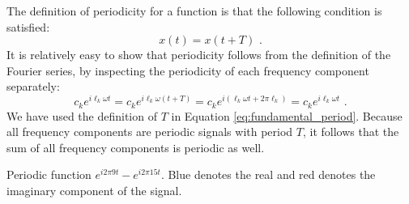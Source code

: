 The definition of periodicity for a function is that the following condition is satisfied:
\begin{equation}
\boxed{
x(t) = x(t+T)
} \,\,.
\end{equation}
It is relatively easy to show that periodicity follows from the definition of the Fourier series, by inspecting the periodicity of each frequency component separately:
\begin{equation}
c_k e^{i \ell_k \omega t} = c_k e^{i \ell_k \omega (t+T)} = c_k e^{i (\ell_k \omega t+ 2\pi \ell_k )} = c_k e^{i \ell_k \omega t} \,\,.
\end{equation}
We have used the definition of $T$ in Equation \ref{eq:fundamental_period}. Because all frequency components are periodic signals with period $T$, it follows that the sum of all frequency components is periodic as well.

\begin{marginfigure}[0cm]
\begin{center}
\end{center}
\caption{Periodic function $e^{i 2\pi 9t} - e^{i 2\pi 15t}$. Blue denotes the real and red denotes the imaginary component of the signal.}
\label{fig:ex_periodic}
\end{marginfigure}

